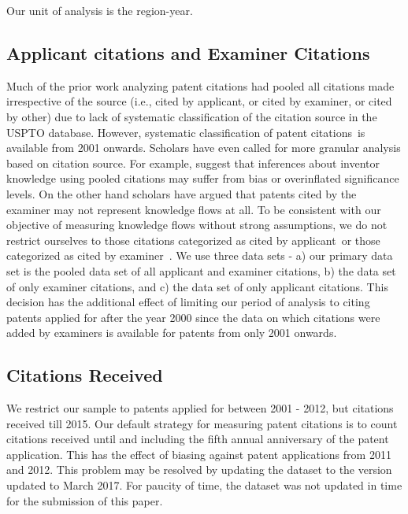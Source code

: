 \documentclass[12pt,letterpaper]{article}
\begin{document}
Our unit of analysis is the region-year. \par

\subsection{Applicant citations and Examiner Citations}
Much of the prior work analyzing patent citations had pooled all citations made irrespective of the source (i.e., cited by applicant, or cited by examiner, or cited by other) due to lack of systematic classification of the citation source in the USPTO database. However, systematic classification of patent citations\textquotesingle \ is available from 2001 onwards. Scholars have even called for more granular analysis based on citation source. For example, \cite{Alcacer2006a} suggest that inferences about inventor knowledge using pooled citations may suffer from bias or overinflated significance levels. On the other hand scholars have argued that patents cited by the examiner may not represent knowledge flows at all. To be consistent with our objective of measuring knowledge flows without strong assumptions, we do not restrict ourselves to those citations categorized as \textquotesingle cited by applicant\textquotesingle \ or those categorized as \textquotesingle cited by examiner\textquotesingle \ . We use three data sets - a) our primary data set is the pooled data set of all applicant and examiner citations, b) the data set of only examiner citations, and c) the data set of only applicant citations. This decision has the additional effect of limiting our period of analysis to citing patents applied for after the year 2000 since the data on which citations were added by examiners is available for patents from only 2001 onwards. 

\subsection{Citations Received}
We restrict our sample to patents applied for between 2001 - 2012, but citations received till 2015. Our default strategy for measuring patent citations is to count citations received until and including the fifth annual anniversary of the patent application. This has the effect of biasing against patent applications from 2011 and 2012.  This problem may be resolved by updating the dataset to the version updated to March 2017. For paucity of time, the dataset was not updated in time for the submission of this paper.\par
\end{document}
